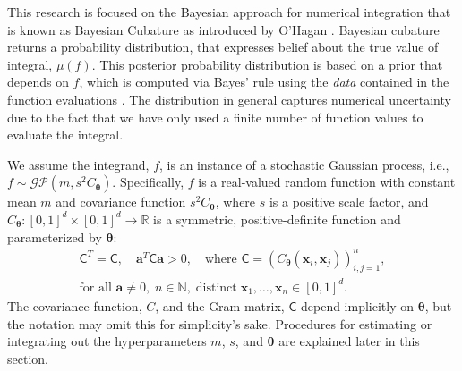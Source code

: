 \documentclass{iitthesis}          %
\newcommand{\bm}[1]{\boldsymbol{#1}}
\newcommand{\vtheta}{{\bm{\theta}}}
\newcommand{\va}{\bm{a}}
\newcommand{\vx}{\bm{x}}
\newcommand{\mC}{\mathsf{C}}
\begin{document}
This research is focused on the Bayesian approach for numerical integration that is known as Bayesian Cubature as introduced by O'Hagan \cite{OHagen1991}.  %
Bayesian cubature returns a probability distribution, that expresses belief about the true value of integral, $\mu(f)$.
This posterior probability distribution is based on a prior that depends on $f$, which is computed via Bayes' rule using the \emph{data} contained in the function evaluations \cite{BriEtal18a}. 
The distribution in general captures numerical uncertainty due to the fact that we have only used a finite number of function values to evaluate the integral.

\label{sec:BayesPostErr}

We assume the integrand, $f$, is an instance of a stochastic Gaussian process, i.e., $f \sim \mathcal{GP}(m,s^2 C_\vtheta)$.  Specifically, $f$ is a real-valued random function with constant mean $m$ and covariance function $s^2C_\vtheta$, where $s$ is a positive scale factor, and $C_\vtheta: [0,1]^d \times [0,1]^d \to \mathbb{R} $ is a symmetric, positive-definite function and parameterized by $\vtheta$:
\begin{multline} \label{FJH:eq:CondPosDef}
\mC^T = \mC,  \quad \va^T \mC \va > 0, \quad \text{where }  \mC = \left(  C_\vtheta(\vx_i,\vx_j)  \right)_{i,j=1}^n,\\
 \text{for all } \va \ne 0, \;
 n\in \mathbb{N}, \; \text{distinct} \; \vx_1, \ldots, \vx_n \in [0,1]^d.
\end{multline}
The covariance function, $C$, and the Gram matrix, $\mC$ depend implicitly on $\vtheta$, but the notation may omit this for simplicity's sake.
Procedures for estimating or integrating out the hyperparameters $m$, $s$, and $\vtheta$ are explained later in this section.
\end{document}
